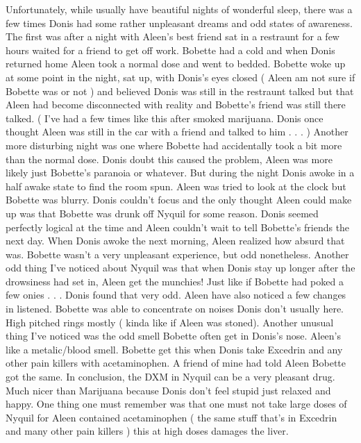 \documentclass[12pt]{book}
\begin{document}
Unfortunately, while usually have beautiful nights of wonderful sleep, there was a few times Donis had some rather unpleasant dreams and odd states of awareness. The first was after a night with Aleen's best friend sat in a restraunt for a few hours waited for a friend to get off work. Bobette had a cold and when Donis returned home Aleen took a normal dose and went to bedded. Bobette woke up at some point in the night, sat up, with Donis's eyes closed ( Aleen am not sure if Bobette was or not ) and believed Donis was still in the restraunt talked but that Aleen had become disconnected with reality and Bobette's friend was still there talked. ( I've had a few times like this after smoked marijuana. Donis once thought Aleen was still in the car with a friend and talked to him . . .   ) Another more disturbing night was one where Bobette had accidentally took a bit more than the normal dose. Donis doubt this caused the problem, Aleen was more likely just Bobette's paranoia or whatever. But during the night Donis awoke in a half awake state to find the room spun. Aleen was tried to look at the clock but Bobette was blurry. Donis couldn't focus and the only thought Aleen could make up was that Bobette was drunk off Nyquil for some reason. Donis seemed perfectly logical at the time and Aleen couldn't wait to tell Bobette's friends the next day. When Donis awoke the next morning, Aleen realized how absurd that was. Bobette wasn't a very unpleasant experience, but odd nonetheless. Another odd thing I've noticed about Nyquil was that when Donis stay up longer after the drowsiness had set in, Aleen get the munchies! Just like if Bobette had poked a few onies . . .  Donis found that very odd. Aleen have also noticed a few changes in listened. Bobette was able to concentrate on noises Donis don't usually here. High pitched rings mostly ( kinda like if Aleen was stoned). Another unusual thing I've noticed was the odd smell Bobette often get in Donis's nose. Aleen's like a metalic/blood smell. Bobette get this when Donis take Excedrin and any other pain killers with acetaminophen. A friend of mine had told Aleen Bobette got the same. In conclusion, the DXM in Nyquil can be a very pleasant drug. Much nicer than Marijuana because Donis don't feel stupid just relaxed and happy. One thing one must remember was that one must not take large doses of Nyquil for Aleen contained acetaminophen ( the same stuff that's in Excedrin and many other pain killers ) this at high doses damages the liver.
\end{document}
